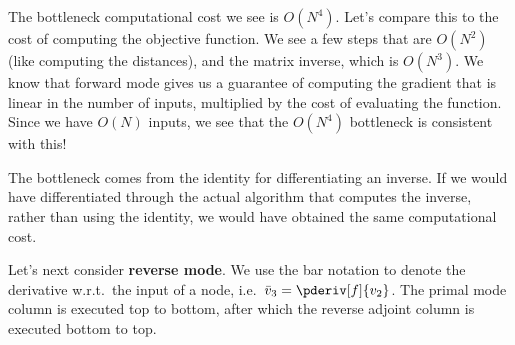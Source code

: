 The bottleneck computational cost we see is $O(N^4)$. Let's compare this to the cost of computing the objective function. We see a few steps that are $O(N^2)$ (like computing the distances), and the matrix inverse, which is $O(N^3)$. We know that forward mode gives us a guarantee of computing the gradient that is linear in the number of inputs, multiplied by the cost of evaluating the function. Since we have $O(N)$ inputs, we see that the $O(N^4)$ bottleneck is consistent with this!

The bottleneck comes from the identity for differentiating an inverse. If we would have differentiated through the actual algorithm that computes the inverse, rather than using the identity, we would have obtained the same computational cost.

Let's next consider \textbf{reverse mode}. We use the bar notation to denote the derivative w.r.t.~the input of a node, i.e.~$\bar v_3 = \pderiv[f]{v_2}$. The primal mode column is executed top to bottom, after which the reverse adjoint column is executed bottom to top.

